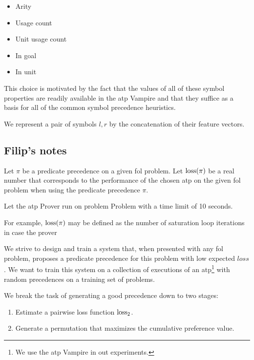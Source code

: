 \begin{itemize}
	\item Arity
	\item Usage count
	\item Unit usage count
	\item In goal
	\item In unit
\end{itemize}

This choice is motivated by the fact that the values of all of these symbol properties
are readily available in the \gls{atp} Vampire
and that they suffice as a basis for all of the common symbol precedence heuristics.

We represent a pair of symbols \(l, r\) by the concatenation of their feature vectors.

\subsection{Filip's notes}

Let \(\pi\) be a predicate precedence on a given \gls{fol} problem.
Let \(\operatorname{loss}(\pi)\) be a real number that corresponds to the performance of the chosen \gls{atp}
on the given \gls{fol} problem when using the predicate precedence \(\pi\).

Let the \gls{atp} Prover run on problem Problem with a time limit of 10 seconds.


For example, \(\operatorname{loss}(\pi)\) may be defined as the number of saturation loop iterations in case the prover

We strive to design and train a system that, when presented with any \gls{fol} problem,
proposes a predicate precedence for this problem with low expected \(loss\).
We want to train this system on a collection of executions of an \gls{atp}\footnote{We use the \gls{atp} Vampire in out experiments.} with random precedences on a training set of problems.

We break the task of generating a good precedence down to two stages:

\begin{enumerate}
	\item Estimate a pairwise loss function \(\operatorname{loss}_2\).
	\item Generate a permutation that maximizes the cumulative preference value.
\end{enumerate}

